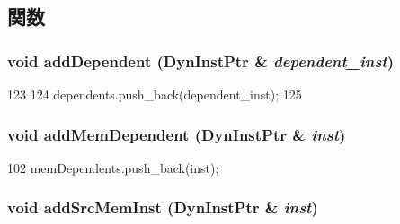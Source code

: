\subsection{関数}
\hypertarget{classOzoneDynInst_a94196a9ba20d5dd3f2e6bb5117417453}{
\subsubsection[{addDependent}]{\setlength{\rightskip}{0pt plus 5cm}void addDependent ({\bf DynInstPtr} \& {\em dependent\_\-inst})}}
\label{classOzoneDynInst_a94196a9ba20d5dd3f2e6bb5117417453}



\begin{DoxyCode}
123 {
124     dependents.push_back(dependent_inst);
125 }
\end{DoxyCode}
\hypertarget{classOzoneDynInst_a04ad69a873bec43dee7056f54e47ee11}{
\subsubsection[{addMemDependent}]{\setlength{\rightskip}{0pt plus 5cm}void addMemDependent ({\bf DynInstPtr} \& {\em inst})}}
\label{classOzoneDynInst_a04ad69a873bec43dee7056f54e47ee11}



\begin{DoxyCode}
102 { memDependents.push_back(inst); }
\end{DoxyCode}
\hypertarget{classOzoneDynInst_a73d116dc8606002353b2b051be86e6fa}{
\subsubsection[{addSrcMemInst}]{\setlength{\rightskip}{0pt plus 5cm}void addSrcMemInst ({\bf DynInstPtr} \& {\em inst})}}
\label{classOzoneDynInst_a73d116dc8606002353b2b051be86e6fa}



